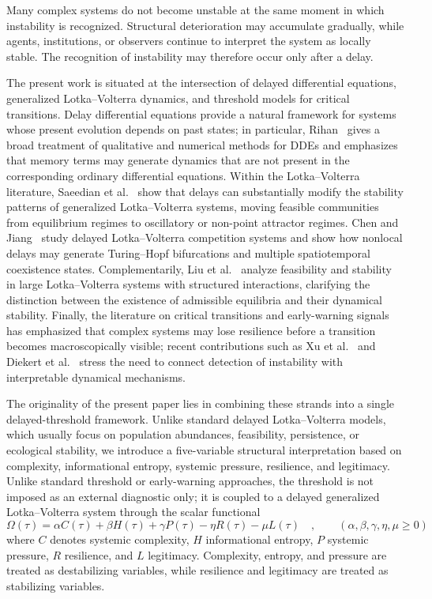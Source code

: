 \documentclass[11pt]{article}
\def\beq{\begin{equation}}
\def\eeq{\end{equation}}
\begin{document}
Many complex systems do not become unstable at the same moment in which instability is recognized. Structural deterioration may accumulate gradually, while agents, institutions, or observers continue to interpret the system as locally stable. The recognition of instability may therefore occur only after a delay.

The present work is situated at the intersection of delayed differential equations, generalized Lotka--Volterra dynamics, and threshold models for critical transitions. Delay differential equations provide a natural framework for systems whose present evolution depends on past states; in particular, Rihan~\cite{rihan2021dde} gives a broad treatment of qualitative and numerical methods for DDEs and emphasizes that memory terms may generate dynamics that are not present in the corresponding ordinary differential equations. Within the Lotka--Volterra literature, Saeedian et al.~\cite{saeedian2022delay} show that delays can substantially modify the stability patterns of generalized Lotka--Volterra systems, moving feasible communities from equilibrium regimes to oscillatory or non-point attractor regimes. Chen and Jiang~\cite{chenjiang2021turinghopf} study delayed Lotka--Volterra competition systems and show how nonlocal delays may generate Turing--Hopf bifurcations and multiple spatiotemporal coexistence states. Complementarily, Liu et al.~\cite{liu2023feasibility} analyze feasibility and stability in large Lotka--Volterra systems with structured interactions, clarifying the distinction between the existence of admissible equilibria and their dynamical stability. Finally, the literature on critical transitions and early-warning signals has emphasized that complex systems may lose resilience before a transition becomes macroscopically visible; recent contributions such as Xu et al.~\cite{xu2023nonequilibrium} and Diekert et al.~\cite{Diekert2025EWSDecisions} stress the need to connect detection of instability with interpretable dynamical mechanisms. 

The originality of the present paper lies in combining these strands into a single delayed-threshold framework. Unlike standard delayed Lotka--Volterra models, which usually focus on population abundances, feasibility, persistence, or ecological stability, we introduce a five-variable structural interpretation based on complexity, informational entropy, systemic pressure, resilience, and legitimacy. Unlike standard threshold or early-warning approaches, the threshold is not imposed as an external diagnostic only; it is coupled to a delayed generalized Lotka--Volterra system through the scalar functional
\beq \label{eq:omega-functional}
\Omega(\tau)
=
\alpha C(\tau)
+
\beta H(\tau)
+
\gamma P(\tau)
-
\eta R(\tau)
-
\mu L(\tau) \quad , \qquad (\alpha  , \beta  , \gamma  , \eta  , \mu \geq 0) 
\eeq
where $C$ denotes systemic complexity, $H$ informational entropy, $P$ systemic pressure, $R$ resilience, and $L$ legitimacy. Complexity, entropy, and pressure are treated as destabilizing variables, while resilience and legitimacy are treated as stabilizing variables.
\end{document}
